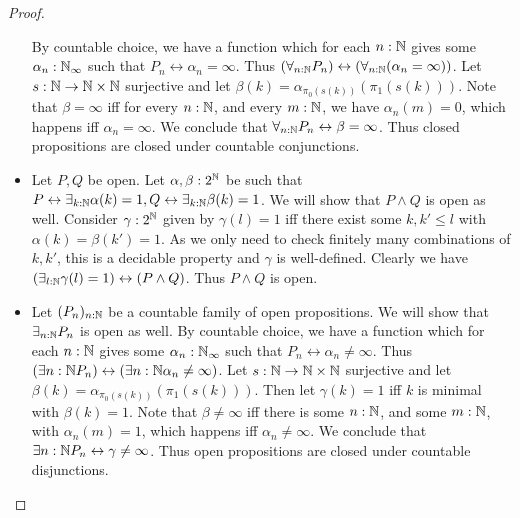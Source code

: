 \begin{proof}
\begin{itemize}
      By countable choice, we have a function which for each 
      $n:\mathbb{N}$ gives some $\alpha_n:\mathbb{N}_{\infty}$ 
      such that $P_n \leftrightarrow \alpha_n =\infty$. 
      Thus $(\forall_{n:\mathbb{N}} P_n )\leftrightarrow 
      (\forall_{n:\mathbb{N}}(\alpha_n = \infty))$. 
      Let $s:\mathbb{N} \to \mathbb{N} \times \mathbb{N}$ surjective and let 
      $\beta(k) = \alpha_{\pi_0(s(k))}(\pi_1 (s(k)))$. 
      Note that $\beta = \infty$ iff for every $n:\mathbb{N}$, 
      and every $m:\mathbb{N}$, we have $\alpha_n(m) = 0$, 
      which happens iff $\alpha_n = \infty$. 
      We conclude that $\forall_{n:\mathbb{N}} P_n \leftrightarrow \beta = \infty$.
      Thus closed propositions are closed under countable conjunctions. 
    \item 
      Let $P,Q$ be open. Let $\alpha,\beta:2^{\mathbb{N}}$ be such that 
      $
      P\leftrightarrow \exists_{k:\mathbb{N}}  \alpha(k) = 1, 
      Q\leftrightarrow \exists_{k:\mathbb{N}}  \beta(k) = 1
      $. 
      We will show that $P\wedge Q$ is open as well. 
      Consider $\gamma:2^{\mathbb{N}}$ given by 
      $\gamma(l) = 1$ iff there exist some $k,k'\leq l$ with 
      $\alpha(k) = \beta(k') = 1$. As we only need to check finitely many combinations 
      of $k,k'$, this is a decidable property and $\gamma$ is well-defined. 
      Clearly we have $(\exists_{l:\mathbb{N}} \gamma(l) = 1) \leftrightarrow (P \wedge Q)$. 
      Thus $P\wedge Q$ is open. 
    \item Let $(P_n)_{n:\mathbb{N}}$ be a countable family of open propositions. 
      We will show that $\exists_{n:\mathbb{N}}P_n$ is open as well. 
      By countable choice, we have a function which for each 
      $n:\mathbb{N}$ gives some $\alpha_n:\mathbb{N}_{\infty}$ 
      such that $P_n \leftrightarrow \alpha_n \neq \infty$. 
      Thus $(\exists{n:\mathbb{N}} P_n) \leftrightarrow 
      (\exists{n:\mathbb{N}}\alpha_n \neq \infty)$. 
      Let $s:\mathbb{N} \to \mathbb{N} \times \mathbb{N}$ surjective and let 
      $\beta(k) = \alpha_{\pi_0(s(k))}(\pi_1 (s(k)))$. 
      Then let $\gamma(k) = 1$ iff $k$ is minimal with $\beta(k) = 1$. 
      Note that $\beta \neq \infty$ iff there is some $n:\mathbb{N}$, 
      and some $m:\mathbb{N}$, with $\alpha_n(m) = 1$, 
      which happens iff $\alpha_n \neq \infty$. 
      We conclude that $\exists{n:\mathbb{N}} P_n \leftrightarrow \gamma \neq \infty$.
      Thus open propositions are closed under countable disjunctions. 
  \end{itemize}   
\end{proof}


